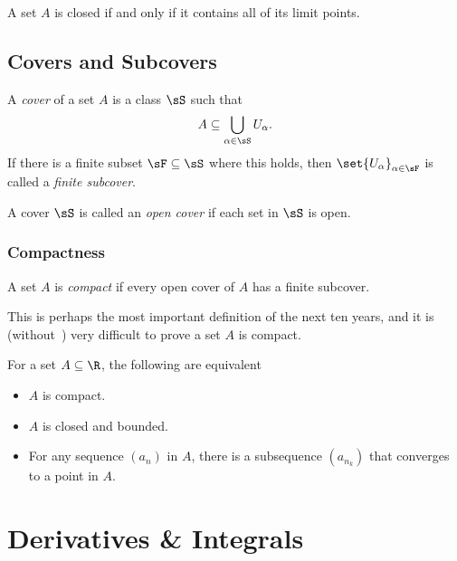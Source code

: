 \documentclass{article}
\begin{document}
\begin{theorem}\label{defn:closed-iff-limit-points}
  A set $A$ is closed if and only if it contains all of its limit points.
\end{theorem}

\subsection{Covers and Subcovers}

\begin{defn}[Cover]\label{defn:cover}
  A \emph{cover} of a set $A$ is a class $\sS$ such that
  \[ A \subseteq \bigcup_{\alpha \in \sS}U_{\alpha}. \]
  If there is a finite subset $\sF \subseteq \sS$ where this holds, then $\set{U_{\alpha}}_{\alpha \in \sF}$
  is called a \emph{finite subcover}.
\end{defn}

\begin{defn}\label{defn:open-cover}
  A cover $\sS$ is called an \emph{open cover} if each set in $\sS$ is open.
\end{defn}

\subsubsection{Compactness}

\begin{defn}[Compactness]\label{defn:compact-set}
  A set $A$ is \emph{compact} if every open cover of $A$ has a finite subcover.
\end{defn}
This is perhaps the most important definition of the next ten years, and it is (without~) very difficult
to prove a set $A$ is compact.

\begin{theorem}\label{thm:heine-borel}
  For a set $A \subseteq \R$, the following are equivalent
  \begin{itemize}
    \item $A$ is compact.
    \item $A$ is closed and bounded.
    \item For any sequence $(a_{n})$ in $A$, there is a subsequence $(a_{n_{k}})$ that converges to a point in $A$.
  \end{itemize}
\end{theorem}

\section*{Derivatives \& Integrals}
\end{document}
